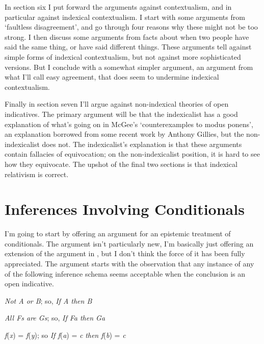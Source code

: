 In section six I put forward the arguments against contextualism, and in particular against indexical contextualism. I start with some arguments from `faultless disagreement', and go through four reasons why these might not be too strong. I then discuss some arguments from facts about when two people have said the same thing, or have said different things. These arguments tell against simple forms of indexical contextualism, but not against more sophisticated versions. But I conclude with a somewhat simpler argument, an argument from what I'll call easy agreement, that does seem to undermine indexical contextualism.

Finally in section seven I'll argue against non-indexical theories of open indicatives. The primary argument will be that the indexicalist has a good explanation of what's going on in McGee's `counterexamples to modus ponens', an explanation borrowed from some recent work by Anthony Gillies, but the non-indexicalist does not. The indexicalist's explanation is that these arguments contain fallacies of equivocation; on the non-indexicalist position, it is hard to see how they equivocate. The upshot of the final two sections is that indexical relativism is correct.


\section{Inferences Involving Conditionals}

I'm going to start by offering an argument for an epistemic treatment of conditionals. The argument isn't particularly new, I'm basically just offering an extension of the argument in \cite{Stalnaker1975-STAIC}, but I don't think the force of it has been fully appreciated. The argument starts with the observation that any instance of any of the following inference schema seems acceptable when the conclusion is an open indicative.

\renewcommand{\labelenumi}{(1.\arabic{enumi})}
\begin{enumerate*}
\setcounter{enumi}{0}
\item \textit{Not A or B}; so, \textit{If A then B}

\item \textit{All Fs are Gs}; so, \textit{If Fa then Ga}

\item \textit{f}(\textit{x}) = \textit{f}(\textit{y}); so \textit{If f}(\textit{a}) = \textit{c} \textit{then f}(\textit{b}) = \textit{c}
\end{enumerate*}

